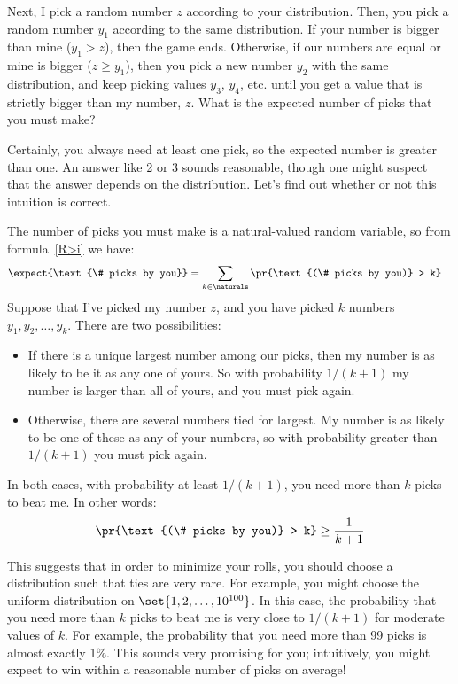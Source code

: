 Next, I pick a random number $z$ according to your distribution.
Then, you pick a random number $y_1$ according to the same
distribution.  If your number is bigger than mine ($y_1 > z$), then
the game ends.  Otherwise, if our numbers are equal or mine is bigger
($z \geq y_1$), then you pick a new number $y_2$ with the same
distribution, and keep picking values $y_3$, $y_4$, etc. until you get
a value that is strictly bigger than my number, $z$.  What is the
expected number of picks that you must make?

Certainly, you always need at least one pick, so the expected number
is greater than one.  An answer like 2 or 3 sounds reasonable, though
one might suspect that the answer depends on the distribution.  Let's
find out whether or not this intuition is correct.

The number of picks you must make is a natural-valued random variable, so
from formula~\eqref{R>i} we have:
\begin{align}
\expect{\text{\# picks by you}}
    & = \sum_{k \in \naturals} \pr{\text{(\# picks by you)} > k} \label{eqn:1}
\end{align}
Suppose that I've picked my number $z$, and you have picked $k$
numbers $y_1, y_2, \dots, y_k$.  There are two possibilities:
%
\begin{itemize}

\item If there is a unique largest number among our picks, then my
number is as likely to be it as any one of yours.  So with probability
$1/(k+1)$ my number is larger than all of yours, and you must pick
again.

\item Otherwise, there are several numbers tied for largest.  My
number is as likely to be one of these as any of your numbers, so with
probability greater than $1/(k+1)$ you must pick again.

\end{itemize}
%
In both cases, with probability at least $1/(k+1)$, you need more than
$k$ picks to beat me.  In other words:
%
\begin{align}
\pr{\text{(\# picks by you)} > k} \geq \frac{1}{k+1} \label{eqn:2}
\end{align}

This suggests that in order to minimize your rolls, you should choose a
distribution such that ties are very rare.  For example, you might
choose the uniform distribution on $\set{1, 2, \dots, 10^{100}}$.  In
this case, the probability that you need more than $k$ picks to beat
me is very close to $1/(k+1)$ for moderate values of $k$.  For
example, the probability that you need more than 99 picks is almost
exactly 1\%.  This sounds very promising for you; intuitively, you
might expect to win within a reasonable number of picks on average!

